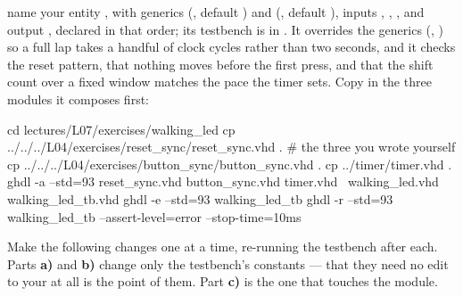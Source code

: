 \selfcheck name your entity , with generics  (,
default ) and  (, default ), inputs
, , , and output , declared in that order; its
testbench is in . It overrides the generics (,
) so a full lap takes a handful of clock cycles rather than two seconds, and it
checks the reset pattern, that nothing moves before the first press, and that the shift count over a
fixed window matches the pace the timer sets. Copy in the three modules it composes first:

\begin{shell}
cd lectures/L07/exercises/walking_led
cp ../../../L04/exercises/reset_sync/reset_sync.vhd .   # the three you wrote yourself
cp ../../../L04/exercises/button_sync/button_sync.vhd .
cp ../timer/timer.vhd .
ghdl -a --std=93 reset_sync.vhd button_sync.vhd timer.vhd \
                 walking_led.vhd walking_led_tb.vhd
ghdl -e --std=93 walking_led_tb
ghdl -r --std=93 walking_led_tb --assert-level=error --stop-time=10ms
\end{shell}

\label{c7:ex:7}
Make the following changes one at a time, re-running the testbench after each. Parts \textbf{a)}
and \textbf{b)} change only the testbench's constants --- that they need no edit to your
\file{walking_led.vhd} at all is the point of them. Part \textbf{c)} is the one that touches the
module.

